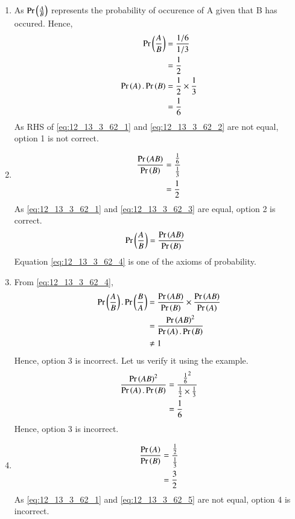 \documentclass[journal,12pt,twocolumn]{IEEEtran}
\theoremstyle{remark}
\begin{document}
\begin{enumerate}
	\item 
	As $\Pr\left(\frac{A}{B}\right)$ represents the probability of occurence of A given that B has occured. Hence,
	\begin{align}
	\pr{\frac{A}{B}} %
	&=\frac{1/6}{1/3}\\
	&=\frac{1}{2}\label{eq:12_13_3_62_1}\\
	\pr{A}.\pr{B} &= \frac{1}{2}\times \frac{1}{3}\\
	&= \frac{1}{6}\label{eq:12_13_3_62_2}
	\end{align}
	As RHS of \eqref{eq:12_13_3_62_1} and \eqref{eq:12_13_3_62_2} are not equal, option 1 is not correct.
	\item
	\begin{align}
		\frac{\Pr\left(AB\right)}{\Pr\left(B\right)} &= \frac{\frac{1}{6}}{\frac{1}{3}}\\
		&= \frac{1}{2}\label{eq:12_13_3_62_3}
	\end{align}
		As \eqref{eq:12_13_3_62_1} and \eqref{eq:12_13_3_62_3} are equal, option 2 is correct.
	\begin{align}
		\Pr\left(\frac{A}{B}\right) &= \frac{\Pr\left(AB\right)}{\Pr\left(B\right)}\label{eq:12_13_3_62_4}
	\end{align}
	Equation \eqref{eq:12_13_3_62_4} is one of the axioms of probability.
	\item
		From \eqref{eq:12_13_3_62_4},
	\begin{align}
		\Pr\left(\frac{A}{B}\right).\Pr\left(\frac{B}{A}\right) &= \frac{\Pr\left(AB\right)}{\Pr\left(B\right)} \times \frac{\Pr\left(AB\right)}{\Pr\left(A\right)}\\
		&= \frac{{\Pr\left(AB\right)}^2}{\Pr\left(A\right).\Pr\left(B\right)}\\
		&\ne 1
	\end{align}
		Hence, option 3 is incorrect. Let us verify it using the example.
	\begin{align}
		\frac{{\Pr\left(AB\right)}^{2}}{\Pr\left(A\right).\Pr\left(B\right)} &= \frac{{\frac{1}{6}}^2}{\frac{1}{2}\times \frac{1}{3}}\\
		&= \frac{1}{6}
	\end{align}
	Hence, option 3 is incorrect.
	\item
	\begin{align}
		\frac{\Pr\left(A\right)}{\Pr\left(B\right)} &= \frac{\frac{1}{2}}{\frac{1}{3}}\\
		&= \frac{3}{2} \label{eq:12_13_3_62_5}
	\end{align}
	As \eqref{eq:12_13_3_62_1} and \eqref{eq:12_13_3_62_5} are not equal, option 4 is incorrect.
\end{enumerate}
\end{document}
